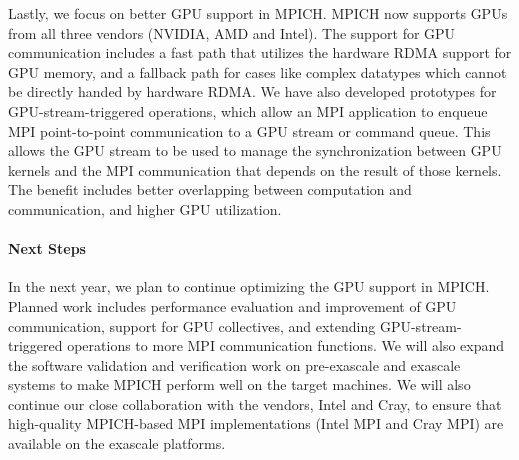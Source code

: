 Lastly, we focus on better GPU support in MPICH. MPICH now supports
GPUs from all three vendors (NVIDIA, AMD and Intel). The support for
GPU communication includes a fast path that utilizes the hardware RDMA
support for GPU memory, and a fallback path for cases like complex
datatypes which cannot be directly handed by hardware RDMA. We have
also developed prototypes for GPU-stream-triggered operations, which allow
an MPI application to enqueue MPI point-to-point communication to a GPU
stream or command queue. This allows the GPU stream to be used to manage
the synchronization between GPU kernels and the MPI communication that
depends on the result of those kernels. The benefit includes better
overlapping between computation and communication, and higher GPU
utilization.


\paragraph{Next Steps}
In the next year, we plan to continue optimizing the GPU support in
MPICH. Planned work includes performance evaluation and improvement of GPU
communication, support for GPU collectives, and  extending
GPU-stream-triggered operations to more MPI communication functions.
We will also expand the software validation and verification work on
pre-exascale and exascale systems to make MPICH perform well on the target
machines. We will also continue our close collaboration with the
vendors, Intel and Cray, to ensure that high-quality MPICH-based MPI implementations
(Intel MPI and Cray MPI) are available on the exascale platforms.
